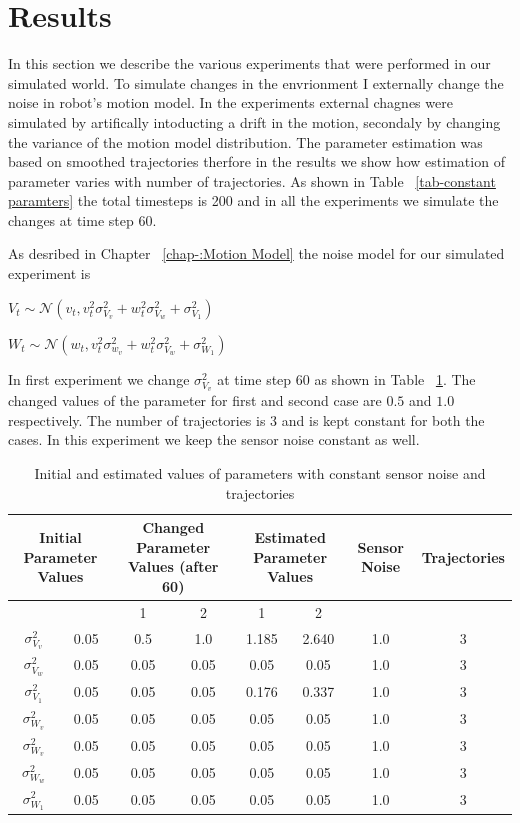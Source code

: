 \documentclass[12pt,draft]{dalcsthesis}
\begin{document}
\section{Results}
In this section we describe the various experiments that were performed in our simulated world. To simulate changes in the envrionment I externally change the noise in robot's motion model. In the experiments external chagnes were simulated by artifically intoducting a drift in the motion, secondaly by changing the variance of the motion model distribution. The parameter estimation was based on smoothed trajectories therfore in the results we show how estimation of parameter varies with number of trajectories. As shown in Table ~\ref{tab-constant paramters} the total timesteps is 200 and in all the experiments we simulate the changes at time step 60. 

As desribed in Chapter ~\ref{chap-:Motion Model} the noise model for our simulated experiment is 

$V_{t}\sim\mathcal{{N}}(v_{t},v_{t}^{2}\sigma_{V_{v}}^{2}+w_{t}^{2}\sigma_{V_{w}}^{2}+\sigma_{V_{1}}^{2})$

$W_{t}\sim\mathcal{{N}}(w_{t},v_{t}^{2}\sigma_{w_{v}}^{2}+w_{t}^{2}\sigma_{V_{w}}^{2}+\sigma_{W_{1}}^{2})$

In first experiment we change $\sigma_{V_{v}}^2$ at time step 60 as shown in Table ~\ref{tab-:varying_sensor_noise}. The changed values of the parameter for first and second case are $0.5$ and $1.0$ respectively. The number of trajectories is 3 and is kept constant for both the cases. In this experiment we keep the sensor noise constant as well. 

\begin{table}[tbh]

\centering



\begin{tabular}{|c|c|c|c|c|c|c|c|}
\hline 
\multicolumn{2}{|c|}{Initial Parameter Values} & \multicolumn{2}{c|}{Changed Parameter Values (after 60)} & \multicolumn{2}{c|}{Estimated Parameter Values} & Sensor Noise & Trajectories\tabularnewline
\hline 
 &  & 1 & 2 & 1 & 2 &  & \tabularnewline
\hline 
$\sigma_{V_{v}}^{2}$ & 0.05 & 0.5 & 1.0 & 1.185 & 2.640 & 1.0 & 3\tabularnewline
\hline 
$\sigma_{V_{w}}^{2}$ & 0.05 & 0.05 & 0.05 & 0.05 & 0.05 & 1.0 & 3\tabularnewline
\hline 
$\sigma_{V_{1}}^{2}$ & 0.05 & 0.05 & 0.05 & 0.176 & 0.337 & 1.0 & 3\tabularnewline
\hline 
$\sigma_{W_{v}}^{2}$ & 0.05 & 0.05 & 0.05 & 0.05 & 0.05 & 1.0 & 3\tabularnewline
\hline 
$\sigma_{W_{v}}^{2}$ & 0.05 & 0.05 & 0.05 & 0.05 & 0.05 & 1.0 & 3\tabularnewline
\hline 
$\sigma_{W_{w}}^{2}$ & 0.05 & 0.05 & 0.05 & 0.05 & 0.05 & 1.0 & 3\tabularnewline
\hline 
$\sigma_{W_{1}}^{2}$ & 0.05 & 0.05 & 0.05 & 0.05 & 0.05 & 1.0 & 3\tabularnewline
\hline 
\end{tabular}
\caption{\label{tab-:varying_sensor_noise}Initial and estimated values of parameters with constant sensor noise
and trajectories}
\end{table}
\end{document}
